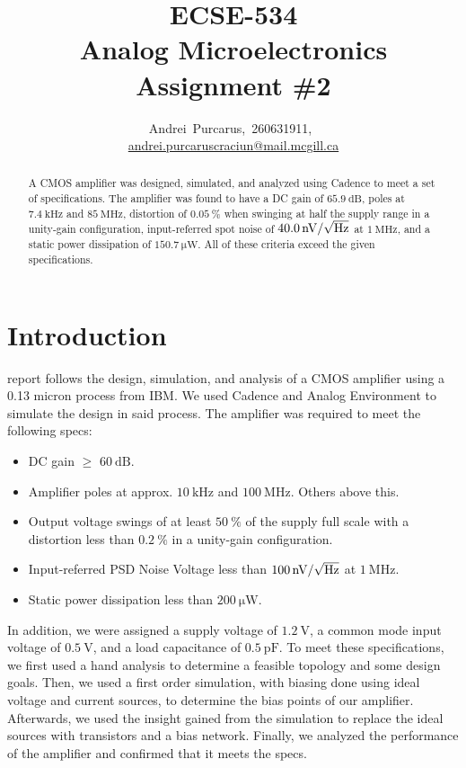 \documentclass[journal,hidelinks]{IEEEtran}
\title{ECSE-534 \\ Analog Microelectronics \\ Assignment \#2}
\author{Andrei~Purcarus,~260631911,~\IEEEmembership{McGill~University} \\ \href{mailto:andrei.purcaruscraciun@mail.mcgill.ca}{andrei.purcaruscraciun@mail.mcgill.ca}}
\begin{document}
\sloppy

\maketitle

\begin{abstract}

A CMOS amplifier was designed, simulated, and analyzed using Cadence to meet a set of specifications. The amplifier was found to have a DC gain of $\SI{65.9}{\deci\bel}$, poles at $\SI{7.4}{\kilo\hertz}$ and $\SI{85}{\mega\hertz}$, distortion of $\SI{0.05}{\percent}$ when swinging at half the supply range in a unity-gain configuration, input-referred spot noise of $\SI{40.0}{\nano\volt\per\sqrt{\hertz}}$ at $\SI{1}{\mega\hertz}$, and a static power dissipation of $\SI{150.7}{\micro\watt}$. All of these criteria exceed the given specifications.

\end{abstract}

\section{Introduction}

 report follows the design, simulation, and analysis of a CMOS amplifier using a 0.13 micron process from IBM. We used Cadence and Analog Environment to simulate the design in said process. The amplifier was required to meet the following specs:
\begin{itemize}
\item DC gain $\ge$ $\SI{60}{\deci\bel}$.
\item Amplifier poles at approx. $\SI{10}{\kilo\hertz}$ and $\SI{100}{\mega\hertz}$. Others above this.
\item Output voltage swings of at least $\SI{50}{\percent}$ of the supply full scale with a distortion less than $\SI{0.2}{\percent}$ in a unity-gain configuration.
\item Input-referred PSD Noise Voltage less than $\SI{100}{\nano\volt\per\sqrt{\hertz}}$ at $\SI{1}{\mega\hertz}$.
\item Static power dissipation less than $\SI{200}{\micro\watt}$.
\end{itemize}

In addition, we were assigned a supply voltage of $\SI{1.2}{\volt}$, a common mode input voltage of $\SI{0.5}{\volt}$, and a load capacitance of $\SI{0.5}{\pico\farad}$. To meet these specifications, we first used a hand analysis to determine a feasible topology and some design goals. Then, we used a first order simulation, with biasing done using ideal voltage and current sources, to determine the bias points of our amplifier. Afterwards, we used the insight gained from the simulation to replace the ideal sources with transistors and a bias network. Finally, we analyzed the performance of the amplifier and confirmed that it meets the specs.
\end{document}

